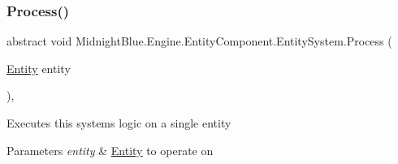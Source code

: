 \hypertarget{class_midnight_blue_1_1_engine_1_1_entity_component_1_1_entity_system_a94aa715ac6bfe9a720c3d12d56c7598c}{}\label{class_midnight_blue_1_1_engine_1_1_entity_component_1_1_entity_system_a94aa715ac6bfe9a720c3d12d56c7598c} 
\subsubsection{\texorpdfstring{Process()}{Process()}}
{\footnotesize\ttfamily abstract void Midnight\+Blue.\+Engine.\+Entity\+Component.\+Entity\+System.\+Process (\begin{DoxyParamCaption}\item[{\hyperlink{class_midnight_blue_1_1_engine_1_1_entity_component_1_1_entity}{Entity}}]{entity }\end{DoxyParamCaption})\hspace{0.3cm}{\ttfamily [protected]}, {}}



Executes this systems logic on a single entity 


\begin{DoxyParams}{Parameters}
{\em entity} & \hyperlink{class_midnight_blue_1_1_engine_1_1_entity_component_1_1_entity}{Entity} to operate on\\
\hline
\end{DoxyParams}


